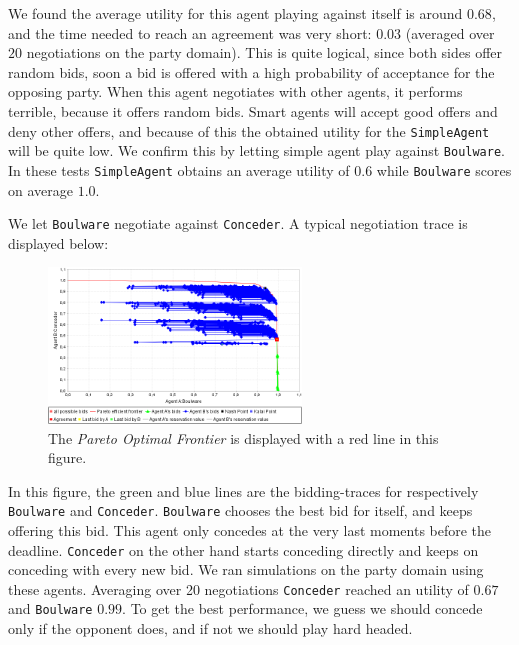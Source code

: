\documentclass[a4paper,10pt]{article}
\begin{document}
We found the average utility for this agent playing against itself is around $0.68$, and the time needed to reach an agreement was very short: $0.03$ (averaged over $20$ negotiations on the party domain).
This is quite logical, since both sides offer random bids, soon a bid is offered with a high probability of acceptance for the opposing party. When this agent negotiates with other agents, it performs terrible, because
it offers random bids. Smart agents will accept good offers and deny other offers,
and because of this the obtained utility for the \texttt{SimpleAgent} will be quite low.
We confirm this by letting simple agent play against \texttt{Boulware}. In these tests \texttt{SimpleAgent} obtains an average utility of $0.6$ while \texttt{Boulware} scores on average $1.0$. 

We let \texttt{Boulware} negotiate against \texttt{Conceder}. A typical negotiation trace is displayed below: \\

\begin{figure}[H]
\begin{center}
 \includegraphics[width=0.6\textwidth]{traceConcederBoulware.png}
 \caption{The \emph{Pareto Optimal Frontier} is displayed with a red line in this figure.}
 \label{fig:bidtrace} 
\end{center}
\end{figure}

In this figure, the green and blue lines are the bidding-traces for respectively \texttt{Boulware} and \texttt{Conceder}. \texttt{Boulware} chooses the best bid for itself, and keeps offering this bid. This agent only concedes at the very last moments before the deadline. \texttt{Conceder} on the other hand starts conceding directly and keeps on conceding with every new bid. We ran simulations on the party domain using these agents. Averaging over 20 negotiations \texttt{Conceder} reached an utility of $0.67$ and
\texttt{Boulware} $0.99$. To get the best performance, we guess we should concede only 
if the opponent does, and if not we should play hard headed.
 
\end{document}

